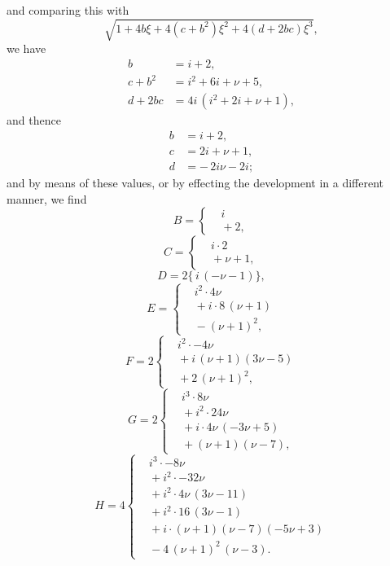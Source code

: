 \documentclass[11pt]{article}
\begin{document}
\noindent and comparing this with
\[
   \sqrt{1 + 4 b \xi + 4(c + b^2)\xi^2 + 4(d + 2 b c)\xi^3},
\]
we have
\[
\begin{aligned}
   b &= i + 2,\\
   c + b^2 &= i^2 + 6 i + \nu + 5,\\
   d + 2 b c &= 4 i\,(i^2 + 2 i + \nu + 1),
\end{aligned}
\]
and thence
\[
\begin{aligned}
   b &= i + 2,\\
   c &= 2 i + \nu + 1,\\
   d &= -\,2 i \nu - 2 i;
\end{aligned}
\]
and by means of these values, or by effecting the development in a different manner, we find
\[
B = \left\{\begin{aligned} &i\\ &{}+ 2,\end{aligned}\right.
\]
\[
C = \left\{\begin{aligned} &i\cdot 2\\ &{}+\nu + 1,\end{aligned}\right.
\]
\[
D = 2\bigl\{\,i\,(-\nu - 1)\bigr\},
\]
\[
E = \left\{\begin{aligned} &i^2\cdot 4\nu\\ &{}+ i\cdot 8\,(\nu + 1)\\ &{}- (\nu + 1)^2,\end{aligned}\right.
\]
\[
F = 2\left\{\begin{aligned} &i^2\cdot -4\nu\\ &{}+ i\,(\nu+1)(3\nu - 5)\\ &{}+ 2\,(\nu + 1)^2,\end{aligned}\right.
\]
\[
G = 2\left\{\begin{aligned} &i^3\cdot 8\nu\\ &{}+ i^2\cdot 24\nu\\ &{}+ i\cdot 4\nu\,(-3\nu + 5)\\ &{}+ (\nu+1)(\nu - 7),\end{aligned}\right.
\]
\[
H = 4\left\{\begin{aligned} &i^3\cdot -8\nu\\ &{}+ i^2\cdot -32\nu\\ &{}+ i^2\cdot 4\nu\,(3\nu - 11)\\ &{}+ i^2\cdot 16\,(3\nu - 1)\\ &{}+ i\cdot (\nu + 1)(\nu - 7)(-5\nu + 3)\\ &{}- 4\,(\nu + 1)^2\,(\nu - 3).\end{aligned}\right.
\]
\end{document}
